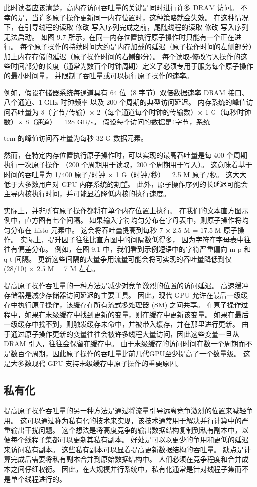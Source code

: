 此时读者应该清楚，高内存访问吞吐量的关键是同时进行许多 DRAM 访问。 
不幸的是，当许多原子操作更新同一内存位置时，这种策略就会失效。 
在这种情况下，在引导线程的读取-修改-写入序列完成之前，尾随线程的读取-修改-写入序列无法启动。 
如图 9.7 所示，在同一内存位置执行原子操作时只能有一个正在进行。 
每个原子操作的持续时间大约是内存加载的延迟（原子操作时间的左侧部分）加上内存存储的延迟（原子操作时间的右侧部分）。 
每个读取-修改写入操作的这些时间部分的长度（通常为数百个时钟周期）定义了必须专用于服务每个原子操作的最小时间量，
并限制了吞吐量或可以执行原子操作的速率。

例如，假设存储器系统每通道具有 64 位（8 字节）双倍数据速率 DRAM 接口、八个通道、1 GHz 时钟频率
以及 200 个周期的典型访问延迟。 
内存系统的峰值访问吞吐量为 8（字节/传输）× 2（每个通道每个时钟的传输数）× 1 G（每秒时钟数）× 8（通道）= 128 GB/s。 
假设每个访问的数据是4字节，系统

tem 的峰值访问吞吐量为每秒 32 G 数据元素。

然而，在特定内存位置执行原子操作时，可以实现的最高吞吐量是每 400 个周期执行一次原子操作
（200 个周期用于读取，200 个周期用于写入）。 
这意味着基于时间的吞吐量为 1/400 原子/时钟 × 1 G（时钟/秒）= 2.5 M 原子/秒。 
这大大低于大多数用户对 GPU 内存系统的期望。 此外，原子操作序列的长延迟可能会主导内核执行时间，并可能显着降低内核的执行速度。

实际上，并非所有原子操作都将在单个内存位置上执行。 在我们的文本直方图示例中，直方图有七个间隔。 
如果输入字符均匀分布在字母表中，则原子操作将均匀分布在 histo 元素中。 
这会将吞吐量提高到每秒 7 × 2.5 M = 17.5 M 原子操作。 实际上，提升因子往往比直方图中的间隔数低得多，
因为字符在字母表中往往有偏差分布。 例如，在图 9.1 中，我们看到示例短语中的字符严重偏向 m-p 和 q-t 间隔。 
更新这些间隔的大量争用流量可能会将可实现的吞吐量降低到仅 (28/10) × 2.5 M = 7 M 左右。

提高原子操作吞吐量的一种方法是减少对竞争激烈的位置的访问延迟。 高速缓冲存储器是减少存储器访问延迟的主要工具。 
因此，现代 GPU 允许在最后一级缓存中执行原子操作，该缓存在所有流式多处理器 (SM) 之间共享。 
在原子操作过程中，如果在末级缓存中找到更新的变量，则在缓存中更新该变量。 
如果在最后一级缓存中找不到，则触发缓存未命中，并被带入缓存，并在那里进行更新。 
由于通过原子操作更新的变量往往会被许多线程大量访问，因此这些变量一旦从 DRAM 引入，往往会保留在缓存中。 
由于末级缓存的访问时间在数十个周期而不是数百个周期，因此原子操作的吞吐量比前几代GPU至少提高了一个数量级。 
这是大多数现代 GPU 支持末级缓存中原子操作的重要原因。

\subsection{私有化}
提高原子操作吞吐量的另一种方法是通过将流量引导远离竞争激烈的位置来减轻争用。 
这可以通过称为私有化的技术来实现，该技术通常用于解决并行计算中的严重输出干扰问题。 
这个想法是将高度竞争的输出数据结构复制到私有副本中，以便每个线程子集都可以更新其私有副本。 
好处是可以以更少的争用和更低的延迟来访问私有副本。 这些私有副本可以显着提高更新数据结构的吞吐量。 
缺点是计算完成后需要将私有副本合并到原始数据结构中。 人们必须在竞争程度和合并成本之间仔细权衡。 
因此，在大规模并行系统中，私有化通常是针对线程子集而不是单个线程进行的。

